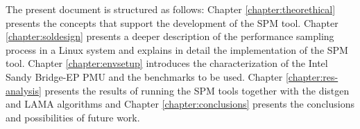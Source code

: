 The present document is structured as follows: Chapter \ref{chapter:theorethical} presents the concepts that support the development of the SPM tool. Chapter \ref{chapter:soldesign} presents a deeper description of the performance sampling process in a Linux system and explains in detail the implementation of the SPM tool. Chapter \ref{chapter:envsetup} introduces the characterization of the Intel Sandy Bridge-EP PMU and the benchmarks to be used. Chapter \ref{chapter:res-analysis} presents the results of running the SPM tools together with the distgen and LAMA algorithms and Chapter \ref{chapter:conclusions} presents the conclusions and possibilities of future work.
